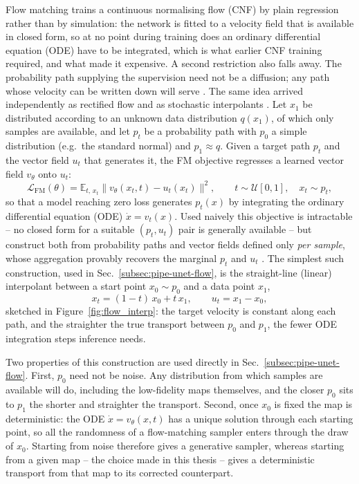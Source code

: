 \documentclass{report}
\begin{document}
Flow matching trains a continuous normalising flow (CNF) by plain regression rather than by simulation: the network is fitted to a velocity field that is available in closed form, so at no point during training does an ordinary differential equation (ODE) have to be integrated, which is what earlier CNF training required, and what made it expensive. A second restriction also falls away. The probability path supplying the supervision need not be a diffusion; any path whose velocity can be written down will serve \cite{lipman_flow_2023}. The same idea arrived independently as rectified flow \cite{liu_flow_2022} and as stochastic interpolants \cite{albergo_building_2023}. Let $x_1$ be distributed according to an unknown data distribution $q(x_1)$, of which only samples are available, and let $p_t$ be a probability path with $p_0$ a simple distribution (e.g.\ the standard normal) and $p_1 \approx q$. Given a target path $p_t$ and the vector field $u_t$ that generates it, the FM objective regresses a learned vector field $v_\theta$ onto $u_t$:
\begin{equation}
    \mathcal{L}_{\mathrm{FM}}(\theta)
      = \mathbb{E}_{t,\,x_t}\big\lVert v_\theta(x_t, t) - u_t(x_t) \big\rVert^2,
      \qquad t \sim \mathcal{U}[0,1],\quad x_t \sim p_t,
    \label{eq:flow_matching}
\end{equation}
so that a model reaching zero loss generates $p_t(x)$ by integrating the ordinary differential equation (ODE) $\dot{x} = v_t(x)$. Used naively this objective is intractable -- no closed form for a suitable $(p_t, u_t)$ pair is generally available -- but \citeauthor{lipman_flow_2023} construct both from probability paths and vector fields defined only \emph{per sample}, whose aggregation provably recovers the marginal $p_t$ and $u_t$ \cite{lipman_flow_2023}. The simplest such construction, used in Sec.~\ref{subsec:pipe-unet-flow}, is the straight-line (linear) interpolant between a start point $x_0 \sim p_0$ and a data point $x_1$,
\begin{equation}
    x_t = (1-t)\,x_0 + t\,x_1, \qquad u_t = x_1 - x_0,
    \label{eq:linear_interpolant}
\end{equation}
sketched in Figure~\ref{fig:flow_interp}: the target velocity is constant along each path, and the straighter the true transport between $p_0$ and $p_1$, the fewer ODE integration steps inference needs.

Two properties of this construction are used directly in Sec.~\ref{subsec:pipe-unet-flow}. First, \mbox{$p_0$} need not be noise. Any distribution from which samples are available will do, including the low-fidelity maps themselves, and the closer \mbox{$p_0$} sits to \mbox{$p_1$} the shorter and straighter the transport. Second, once \mbox{$x_0$} is fixed the map is deterministic: the ODE \mbox{$\dot x = v_\theta(x,t)$} has a unique solution through each starting point, so all the randomness of a flow-matching sampler enters through the draw of \mbox{$x_0$}. Starting from noise therefore gives a generative sampler, whereas starting from a given map -- the choice made in this thesis -- gives a deterministic transport from that map to its corrected counterpart.
\end{document}
